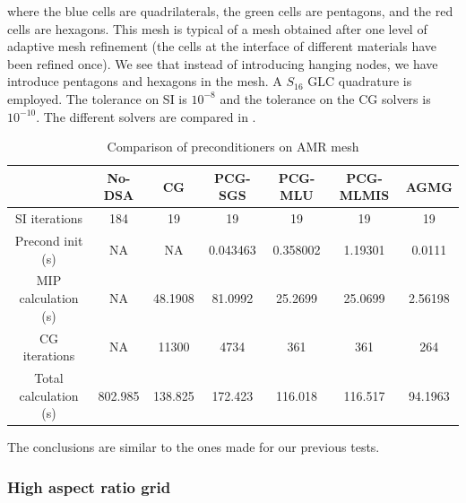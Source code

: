 where the blue cells are quadrilaterals, the green cells are pentagons, and
the red cells are hexagons. This mesh is typical of a mesh obtained after one 
level of adaptive mesh
refinement (the cells at the interface of different materials have been refined
once). We see that instead of introducing hanging nodes, we have introduce
pentagons and hexagons in the mesh.
A $S_{16}$ GLC quadrature is employed. The tolerance on SI is $10^{-8}$ and
the tolerance on the CG solvers is $10^{-10}$.
The different solvers are compared in .
\begin{table}[H]
  \caption{Comparison of preconditioners on AMR mesh}
  \begin{center}
    \begin{tabular}{|c|c|c|c|c|c|c|}
      \hline
       & No-DSA & CG & PCG-SGS & PCG-MLU & PCG-MLMIS & AGMG \\
      \hline
   SI iterations & 184     & 19      & 19       & 19      & 19       & 19 \\
Precond init (s) & NA      & NA      & 0.043463 & 0.358002 & 1.19301 & 0.0111\\
MIP calculation (s) & NA   & 48.1908 & 81.0992  & 25.2699 & 25.0699  & 
      2.56198\\
   CG iterations & NA      & 11300   & 4734     & 361     & 361      & 264 \\
     Total calculation (s) & 802.985 & 138.825 & 172.423  & 116.018 & 116.517  &
      94.1963\\
      \hline
    \end{tabular}
    \label{table_amr}
  \end{center}
\end{table}
The conclusions are similar to the ones made for our previous tests.

\subsubsection{High aspect ratio grid}

